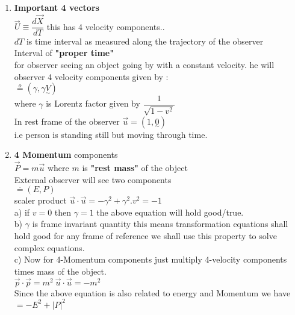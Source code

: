 \documentclass[11pt,a4paper]{article}
\begin{document}
\begin{enumerate}
\begin{enumerate}
\begin{enumerate}
			            \item \textbf{Important 4 vectors}\\
			                  $\vec{U}\equiv  \dfrac{d\vec{X}}{dT}$ this has 4 velocity components..\\
			                  $dT$ is time interval as measured along the trajectory of the observer \\
			                  Interval of \textbf{"proper time"}\\
			                  for observer seeing an object going by with a constant velocity. he will observer 4 velocity components given by :\\
			                  $\mathop = \limits^{o}_{} (\gamma,\gamma \underset{\sim}{V})$\\
			                  where $\gamma$ is Lorentz factor given by $\dfrac{1}{\sqrt{1-v^2}}$\\
			                  In rest frame of the observer $\vec{u} = (1,\underset{\sim}{0})$\\
			                  i.e person is standing still but moving through time.\\
			            \item \textbf{4 Momentum} components\\
			                  $\vec{P} = m \vec{u}$ where $m$ is \textbf{"rest mass"} of the object\\
			                  External observer will see two components\\
			                  $\mathop = \limits^{\cdot}_{} (E,P)$\\
			                  scaler product $\vec{u} \cdot \vec{u} = -\gamma^2 + \gamma^2.v^2 = -1$\\
			                  a) if $v=0$ then $\gamma=1$ the above equation will hold good/true.\\
			                  b) $\gamma$ is frame invariant quantity this means transformation equations shall hold good for any frame of reference we shall use this property to solve complex equations.\\
			                  c) Now for 4-Momentum components just multiply 4-velocity components times mass of the object.\\
			                  $\vec{p} \cdot \vec{p}=m^2\ \vec{u} \cdot \vec{u} = -m^2$\\
			                  Since the above equation is also related to energy and Momentum we have\\
			                  $=-E^2 + \lvert P \rvert^2$\\

\end{enumerate}
\end{enumerate}
\end{enumerate}
\end{document}
